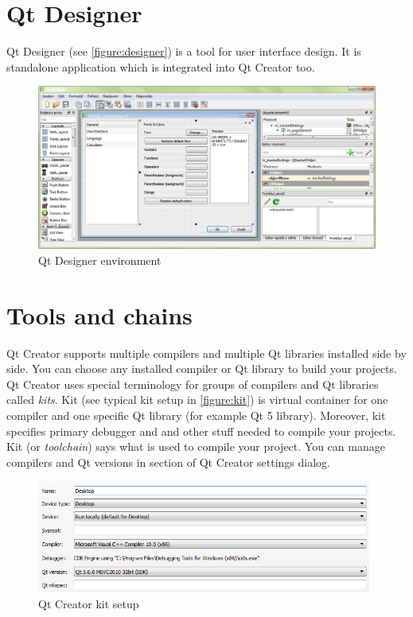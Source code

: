 \section{Qt Designer}
Qt Designer (see \autoref{figure:designer}) is a tool for user interface design. It is standalone application which is integrated into Qt Creator too.

\begin{figure}[ht]
\centering
\includegraphics[width=14.5cm]{graphics/laboratory/07-designer.png}
\caption{Qt Designer environment}\label{figure:designer}
\end{figure}

\section{Tools and chains}
Qt Creator supports multiple compilers and multiple Qt libraries installed side by side. You can choose any installed compiler or Qt library to build your projects. Qt Creator uses special terminology for groups of compilers and Qt libraries called \textit{kits}. Kit (see typical kit setup in \autoref{figure:kit}) is virtual container for one compiler and one specific Qt library (for example Qt 5 library). Moreover, kit specifies primary debugger and and other stuff needed to compile your projects. Kit (or \textit{toolchain}) says what is used to compile your project. You can manage compilers and Qt versions in section of Qt Creator settings dialog.

\begin{figure}[ht]
\centering
\includegraphics[width=11cm]{graphics/laboratory/08-qtcreator-kits.png}
\caption{Qt Creator kit setup}\label{figure:kit}
\end{figure}

